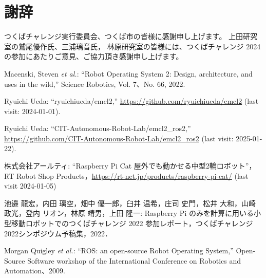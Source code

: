 \documentclass[twocolumn,9pt]{jsproceedings}
\begin{document}
\section*{謝辞}
つくばチャレンジ実行委員会、つくば市の皆様に感謝申し上げます。
上田研究室の鷲尾優作氏、三浦璃音氏，
林原研究室の皆様には、つくばチャレンジ 2024の参加にあたりご意見、ご協力頂き感謝申し上げます。

\footnotesize
\begin{thebibliography}{99}

  Macenski, Steven {\it et al.}: ``Robot Operating System 2: Design, architecture, and uses in the wild,''
  Science Robotics, Vol. 7、No. 66, 2022.

  Ryuichi Ueda: ``ryuichiueda/emcl2,'' \url{https://github.com/ryuichiueda/emcl2} (last visit: 2024-01-01).

  Ryuichi Ueda: ``CIT-Autonomous-Robot-Lab/emcl2\_ros2,'' \url{https://github.com/CIT-Autonomous-Robot-Lab/emcl2_ros2} (last visit: 2025-01-22).
  
 

  株式会社アールティ: ``Raspberry Pi Cat 屋外でも動かせる中型2輪ロボット''，
  RT Robot Shop Products，\url{https://rt-net.jp/products/raspberry-pi-cat/} (last visit 2024-01-05)

  池邉 龍宏，内田 璃空，畑中 優一郎，臼井 温希，庄司 史門，松井 大和，山崎 政光，登内 リオン，林原 靖男，上田 隆一: Raspberry Pi のみを計算に用いる小型移動ロボットでのつくばチャレンジ 2022 参加レポート，つくばチャレンジ2022シンポジウム予稿集，2022．

  Morgan Quigley {\it et al.}: ``ROS: an open-source Robot Operating System,''
  Open-Source Software workshop of the International Conference on Robotics and Automation、2009.





\end{thebibliography}
\end{document}
